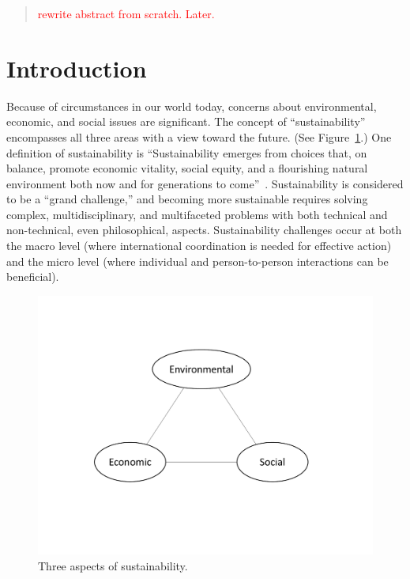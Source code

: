 \documentclass[12pt]{article}
\date{}                           %
\newcommand{\ins}[1]{\textcolor{red}{#1}}
\begin{document}
	
\maketitle

\begin{abstract}
\noindent
\ins{rewrite abstract from scratch. Later.}

\end{abstract}


\section{Introduction}
\label{sec:introduction}

Because of circumstances in our world today, 
concerns about environmental, economic, and social 
issues are significant. 
The concept of ``sustainability'' encompasses all three areas
with a view toward the future. 
(See Figure~\ref{fig:3_sustain}.)
One definition of sustainability is
``Sustainability emerges from choices that, on balance, 
promote economic vitality, social equity, and a flourishing natural environment 
both now and for generations to come''~\autocite{Calvin-College-2017}.
Sustainability is considered to be a ``grand challenge,'' 
and becoming more sustainable requires solving 
complex, multidisciplinary, and multifaceted problems
with both technical and non-technical, even philosophical, aspects. 
Sustainability challenges occur at both the 
macro level (where international coordination is needed for effective action) and
the micro level (where individual and person-to-person interactions can be beneficial). 

\begin{figure}
\centering
\includegraphics[width=0.75\linewidth]{figure_other/TriangleDiagram.pdf}
\caption{Three aspects of sustainability.}
\label{fig:3_sustain}
\end{figure}
\end{document}
